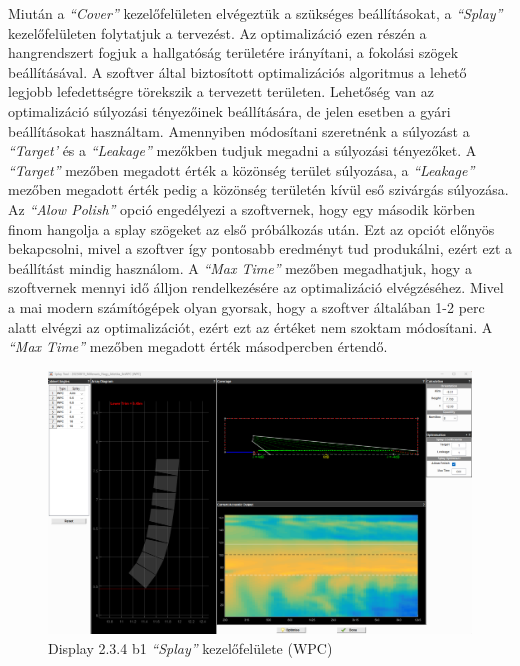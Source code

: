 Miután a \textit{``Cover''} kezelőfelületen elvégeztük a szükséges beállításokat, a \textit{``Splay''} kezelőfelületen folytatjuk a tervezést.
Az optimalizáció ezen részén a hangrendszert fogjuk a hallgatóság területére irányítani, a fokolási szögek beállításával.
A szoftver által biztosított optimalizációs algoritmus a lehető legjobb lefedettségre törekszik a tervezett területen.
Lehetőség van az optimalizáció súlyozási tényezőinek beállítására, de jelen esetben a gyári beállításokat használtam.
Amennyiben módosítani szeretnénk a súlyozást a \textit{``Target'} és a \textit{``Leakage''} mezőkben tudjuk megadni a súlyozási tényezőket.
A \textit{``Target''} mezőben megadott érték a közönség terület súlyozása,
a \textit{``Leakage''} mezőben megadott érték pedig a közönség területén kívül eső szivárgás súlyozása.
Az \textit{``Alow Polish''} opció engedélyezi a szoftvernek, hogy egy második körben finom hangolja a splay szögeket az első próbálkozás után.
Ezt az opciót előnyös bekapcsolni, mivel a szoftver így pontosabb eredményt tud produkálni, ezért ezt a beállítást mindig használom.
A \textit{``Max Time''} mezőben megadhatjuk, hogy a szoftvernek mennyi idő álljon rendelkezésére az optimalizáció elvégzéséhez.
Mivel a mai modern számítógépek olyan gyorsak, hogy a szoftver általában 1-2 perc alatt elvégzi az optimalizációt, ezért ezt az értéket
nem szoktam módosítani. A \textit{``Max Time''} mezőben megadott érték másodpercben értendő.
\begin{figure}[H]
	\centering
	\includegraphics[width=\textwidth, keepaspectratio]{figures/display_wpc_3.png}
	\caption{Display 2.3.4 b1 \textit{``Splay''} kezelőfelülete (WPC)}\label{fig:display_wpc_3}
\end{figure}
